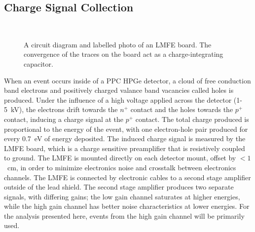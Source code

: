 \documentclass[/main.tex]{subfiles}
\begin{document}
\subsection{Charge Signal Collection} \label{sec:signalelectronics}
\begin{figure}
  \centering
  ~
  \caption[LMFE circuit diagram and photo]{\label{fig:lmfe}
    A circuit diagram and labelled photo of an LMFE board. The convergence of the traces on the board act as a charge-integrating capacitor.
  }
\end{figure}
When an event occurs inside of a PPC HPGe detector, a cloud of free conduction band electrons and positively charged valance band vacancies called holes is produced.
Under the influence of a high voltage applied across the detector (1-5~kV), the electrons drift towards the $n^+$ contact and the holes towards the $p^+$ contact, inducing a charge signal at the $p^+$ contact.
The total charge produced is proportional to the energy of the event, with one electron-hole pair produced for every 0.7~eV of energy deposited.
The induced charge signal is measured by the LMFE board, which is a charge sensitive preamplifier that is resistively coupled to ground\cite{barton2012}.
The LMFE is mounted directly on each detector mount, offset by $<1$~cm, in order to minimize electronics noise and crosstalk between electronics channels.
The LMFE is connected by electronic cables to a second stage amplifier outside of the lead shield.
The second stage amplifier produces two separate signals, with differing gains; the low gain channel saturates at higher energies, while the high gain channel has better noise characteristics at lower energies.
For the analysis presented here, events from the high gain channel will be primarily used.
\end{document}
